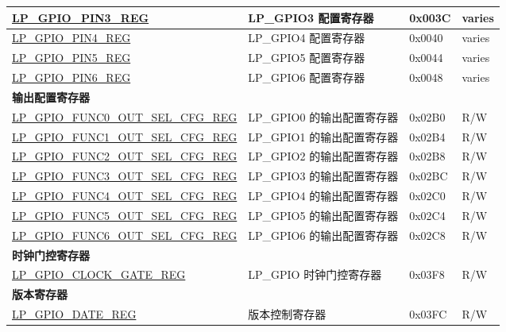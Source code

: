 \begin{longtable}{ | p{6cm} | p{7.2cm} | p{1.3cm} | p{1cm} | }
\hyperref[regdesc:LPGPIOPINNREG]{LP\_GPIO\_PIN3\_REG} & LP\_GPIO3 配置寄存器 & 0x003C & varies \\ \hline
\hyperref[regdesc:LPGPIOPINNREG]{LP\_GPIO\_PIN4\_REG} & LP\_GPIO4 配置寄存器 & 0x0040 & varies \\ \hline
\hyperref[regdesc:LPGPIOPINNREG]{LP\_GPIO\_PIN5\_REG} & LP\_GPIO5 配置寄存器 & 0x0044 & varies \\ \hline
\hyperref[regdesc:LPGPIOPINNREG]{LP\_GPIO\_PIN6\_REG} & LP\_GPIO6 配置寄存器 & 0x0048 & varies \\ \hline
\multicolumn{4}{|l|}{\textbf{输出配置寄存器}} \\ \hline
\hyperref[regdesc:LPGPIOFUNCNOUTSELCFGREG]{LP\_GPIO\_FUNC0\_OUT\_SEL\_CFG\_REG} & LP\_GPIO0 的输出配置寄存器 & 0x02B0 & R/W \\ \hline
\hyperref[regdesc:LPGPIOFUNCNOUTSELCFGREG]{LP\_GPIO\_FUNC1\_OUT\_SEL\_CFG\_REG} & LP\_GPIO1 的输出配置寄存器 & 0x02B4 & R/W \\ \hline
\hyperref[regdesc:LPGPIOFUNCNOUTSELCFGREG]{LP\_GPIO\_FUNC2\_OUT\_SEL\_CFG\_REG} & LP\_GPIO2 的输出配置寄存器 & 0x02B8 & R/W \\ \hline
\hyperref[regdesc:LPGPIOFUNCNOUTSELCFGREG]{LP\_GPIO\_FUNC3\_OUT\_SEL\_CFG\_REG} & LP\_GPIO3 的输出配置寄存器 & 0x02BC & R/W \\ \hline
\hyperref[regdesc:LPGPIOFUNCNOUTSELCFGREG]{LP\_GPIO\_FUNC4\_OUT\_SEL\_CFG\_REG} & LP\_GPIO4 的输出配置寄存器 & 0x02C0 & R/W \\ \hline
\hyperref[regdesc:LPGPIOFUNCNOUTSELCFGREG]{LP\_GPIO\_FUNC5\_OUT\_SEL\_CFG\_REG} & LP\_GPIO5 的输出配置寄存器 & 0x02C4 & R/W \\ \hline
\hyperref[regdesc:LPGPIOFUNCNOUTSELCFGREG]{LP\_GPIO\_FUNC6\_OUT\_SEL\_CFG\_REG} & LP\_GPIO6 的输出配置寄存器 & 0x02C8 & R/W \\ \hline
\multicolumn{4}{|l|}{\textbf{时钟门控寄存器}} \\ \hline
\hyperref[regdesc:LPGPIOCLOCKGATEREG]{LP\_GPIO\_CLOCK\_GATE\_REG} & LP\_GPIO 时钟门控寄存器 & 0x03F8 & R/W \\ \hline
\multicolumn{4}{|l|}{\textbf{版本寄存器}} \\ \hline
\hyperref[regdesc:LPGPIODATEREG]{LP\_GPIO\_DATE\_REG} & 版本控制寄存器 & 0x03FC & R/W \\ \hline
\end{longtable}
